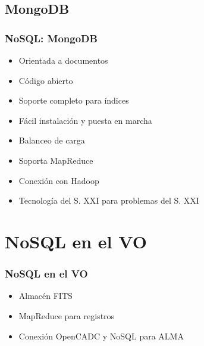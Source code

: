 \documentclass[serif,12pt]{beamer}
\begin{document}
\subsection{MongoDB}
\begin{frame}
\frametitle{NoSQL: MongoDB}

\begin{itemize}
\item Orientada a documentos
\item Código abierto
\item Soporte completo para índices
\item Fácil instalación y puesta en marcha
\item Balanceo de carga
\item Soporta MapReduce
\item Conexión con Hadoop
\item Tecnología del S. XXI para problemas del S. XXI
\end{itemize}


\end{frame}

\section{NoSQL en el VO}
\begin{frame}
\frametitle{NoSQL en el VO}

\begin{itemize}
\item Almacén FITS
\item MapReduce para registros
\item Conexión OpenCADC y NoSQL para ALMA
\end{itemize}


\end{frame}


\end{document}
